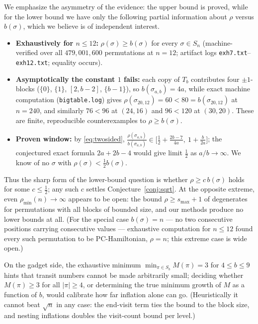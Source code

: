 \documentclass[11pt]{article}
\theoremstyle{definition}
\newcommand{\pmin}{\rho_{\min}}
\begin{document}
We emphasize the asymmetry of the evidence: the upper bound is proved, while for
the lower bound we have only the following partial information about $\rho$ versus
$b(\sigma)$, which we believe is of independent interest.
\begin{itemize}
\item \textbf{Exhaustively for $n \le 12$:} $\rho(\sigma) \ge b(\sigma)$ for every
$\sigma \in S_n$ (machine-verified over all $479{,}001{,}600$ permutations at
$n = 12$; artifact logs \texttt{exh7.txt}--\texttt{exh12.txt}; equality occurs).
\item \textbf{Asymptotically the constant $1$ fails:} each copy of $T_b$
contributes four $\pm1$-blocks ($\{0\}$, $\{1\}$, $[2, b-2]$, $\{b-1\}$), so
$b(\sigma_{a,b}) = 4a$, while exact machine computation
(\texttt{bigtable.log}) gives $\rho(\sigma_{20,12}) = 60 < 80 =
b(\sigma_{20,12})$ at $n = 240$, and similarly $76 < 96$ at $(24,16)$ and
$96 < 120$ at $(30,20)$. These are finite, reproducible counterexamples to
$\rho \ge b(\sigma)$.
\item \textbf{Proven window:} by \eqref{eq:twosided},
$\tfrac{\rho(\sigma_{a,b})}{b(\sigma_{a,b})} \in
\bigl[\tfrac12 + \tfrac{2b-7}{4a},\ 1 + \tfrac{b}{2a}\bigr]$; the conjectured
exact formula $2a + 2b - 4$ would give limit $\tfrac12$ as $a/b \to \infty$. We
know of no $\sigma$ with $\rho(\sigma) < \tfrac12 b(\sigma)$.
\end{itemize}
Thus the sharp form of the lower-bound question is whether
$\rho \ge c\,b(\sigma)$ holds for some $c \le \tfrac12$; any such $c$ settles
Conjecture~\ref{conj:sqrt}. At the opposite extreme, even $\pmin(n) \to \infty$
appears to be open: the bound $\rho \ge s_{\max} + 1$ of \cite{Liz26} degenerates
for permutations with all blocks of bounded size, and our methods produce no lower
bounds at all. (For the special case $b(\sigma) = n$ --- no two consecutive
positions carrying consecutive values --- exhaustive computation for $n \le 12$
found every such permutation to be PC-Hamiltonian, $\rho = n$; this extreme case
is wide open.)

On the gadget side, the exhaustive minimum $\min_{\pi \in S_b} M(\pi) = 3$ for
$4 \le b \le 9$ hints that transit numbers cannot be made arbitrarily small;
deciding whether $M(\pi) \ge 3$ for all $|\pi| \ge 4$, or determining the true
minimum growth of $M$ as a function of $b$, would calibrate how far inflation
alone can go. (Heuristically it cannot beat $\sqrt n$ in any case: the end-visit
term ties the bound to the block size, and nesting inflations doubles the
visit-count bound per level.)
\end{document}
